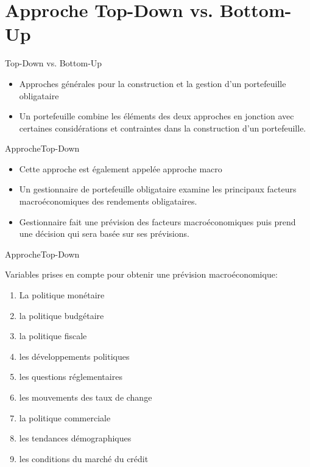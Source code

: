 \documentclass[10pt,a4paper]{beamer}
\begin{document}
\section{Approche Top-Down vs.  Bottom-Up}
\begin{frame}{Top-Down vs. Bottom-Up}

\begin{itemize}[label=\bullet]
\item Approches générales pour la construction et la gestion d'un portefeuille obligataire
\item Un portefeuille combine les éléments des deux approches en jonction avec certaines considérations et contraintes dans la construction d'un portefeuille.
\end{itemize}
\end{frame}


\begin{frame}{ApprocheTop-Down}
\begin{itemize}[label=\bullet]
\item Cette approche est également appelée approche macro
\item Un gestionnaire de portefeuille obligataire examine les principaux facteurs macroéconomiques des rendements obligataires.
\item Gestionnaire fait une prévision des facteurs macroéconomiques puis prend une décision qui sera basée sur ses prévisions.
\end{itemize}
\end{frame}


\begin{frame}{ApprocheTop-Down}

Variables prises en compte pour obtenir une prévision macroéconomique:
\begin{enumerate}[label=\arabic*)]
\item La politique monétaire
\item la politique budgétaire
\item la politique fiscale
\item les développements politiques
\item les questions réglementaires
\item les mouvements des taux de change
\item la politique commerciale
\item les tendances démographiques
\item les conditions du marché du crédit
\end{enumerate}
\end{frame}
\end{document}
